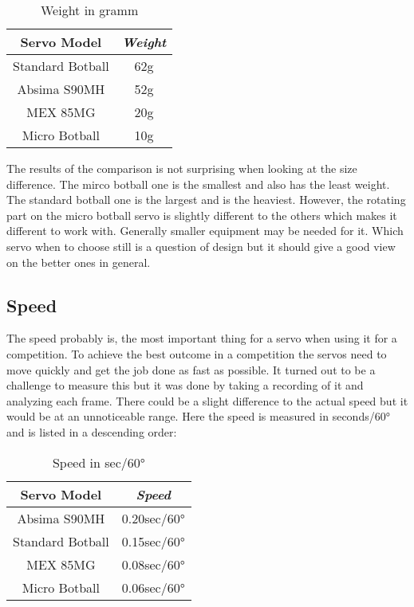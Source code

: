 \documentclass[conference]{IEEEtran}
\begin{document}
\begin{table}[htbp]
\caption{Weight in gramm}
\begin{center}
\begin{tabular}{|c|c|}
\hline
\textbf{Servo Model} & \textbf{\textit{Weight}} \\
\hline
Standard Botball & 62g \\
Absima S90MH & 52g \\
MEX 85MG & 20g \\
Micro Botball & 10g \\
\hline
\end{tabular}
\label{tab3}
\end{center}
\end{table}

The results of the comparison is not surprising when looking at the size difference. The mirco botball one is the smallest and also has the least weight. The standard botball one is the largest and is the heaviest. However, the rotating part on the micro botball servo is slightly different to the others which makes it different to work with. Generally smaller equipment may be needed for it. 
Which servo when to choose still is a question of design but it should give a good view on the better ones in general. 

\subsection{Speed}
The speed probably is, the most important thing for a servo when using it for a competition. To achieve the best outcome in a competition the servos need to move quickly and get the job done as fast as possible. It turned out to be a challenge to measure this but it was done by taking a recording of it and analyzing each frame. There could be a slight difference to the actual speed but it would be at an unnoticeable range. Here the speed is measured in seconds/60° and is listed in a descending order:

\begin{table}[htbp]
\caption{Speed in sec/60°}
\begin{center}
\begin{tabular}{|c|c|}
\hline
\textbf{Servo Model} & \textbf{\textit{Speed}} \\
\hline
Absima S90MH & 0.20sec/60° \\
Standard Botball & 0.15sec/60° \\
MEX 85MG & 0.08sec/60° \\
Micro Botball & 0.06sec/60° \\
\hline
\end{tabular}
\label{tab4}
\end{center}
\end{table}
\end{document}

